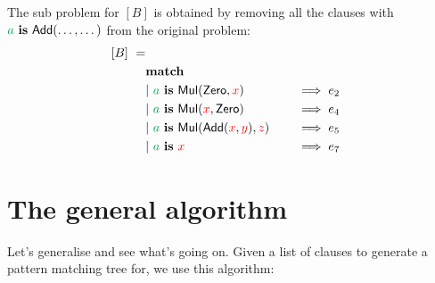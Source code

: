 \documentclass[a4paper, 11pt]{article}
\theoremstyle{definition}
\begin{document}
\medskip

\noindent
The sub problem for $[B]$ is obtained by removing all the clauses with $\ba \is \mathsf{Add(\dots,\dots)}$ from the original problem:
\begin{alignat*}{4}
  [B]\ =\\
  \matchclauses \\
  \clause{\ba \is \Mul(\Zero, \fvar{x})}{e_2} \\
  \clause{\ba \is \Mul(\fvar x, \Zero)}{e_4} \\
  \clause{\ba \is \Mul(\Add(\fvar x, \fvar y), \fvar z)}{e_5} \\
  \clause{\ba \is \fvar x}{e_7}
\end{alignat*}

\section{The general algorithm}

Let's generalise and see what's going on. Given a list of clauses to generate a pattern matching tree for, we use this algorithm:
\end{document}
